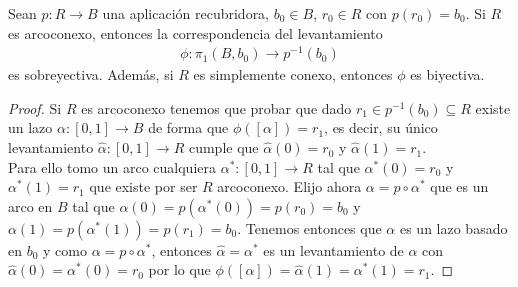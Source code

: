 \begin{teo}
    Sean $p:R \to B$ una aplicación recubridora, $b_0\in B$, $r_0\in R$ con $p(r_0)=b_0$. Si $R$ es arcoconexo, entonces la correspondencia del levantamiento 
    \begin{align*}
        \phi: \pi_1(B,b_0) \to p^{-1}(b_0)
    \end{align*}
    es sobreyectiva. Además, si $R$ es simplemente conexo, entonces $\phi$ es biyectiva.
    \begin{proof}
        Si $R$ es arcoconexo tenemos que probar que dado $r_1\in p^{-1}(b_0)\subseteq R$ existe un lazo $\alpha:[0,1]\to B$ de forma que $\phi([\alpha]) = r_1$, es decir, su único levantamiento $\hat{\alpha}:[0,1]\to R$ cumple que $\hat{\alpha}(0) = r_0$ y $\hat{\alpha}(1) = r_1$.\\

        Para ello tomo un arco cualquiera $\alpha^*:[0,1]\to R$ tal que $\alpha^*(0) = r_0$ y $\alpha^*(1) = r_1$ que existe por ser $R$ arcoconexo. Elijo ahora $\alpha = p\circ \alpha^*$ que es un arco en $B$ tal que $\alpha(0)= p(\alpha^*(0)) = p(r_0) = b_0$ y $\alpha(1) = p(\alpha^*(1)) = p(r_1) = b_0$. Tenemos entonces que $\alpha$ es un lazo basado en $b_0$ y como $\alpha=p\circ \alpha^*$, entonces $\hat{\alpha} = \alpha^*$ es un levantamiento de $\alpha$ con $\hat{\alpha}(0) = \alpha^*(0) = r_0$ por lo que $\phi([\alpha]) = \hat{\alpha}(1) = \alpha^*(1) = r_1$.
    \end{proof}
\end{teo}



